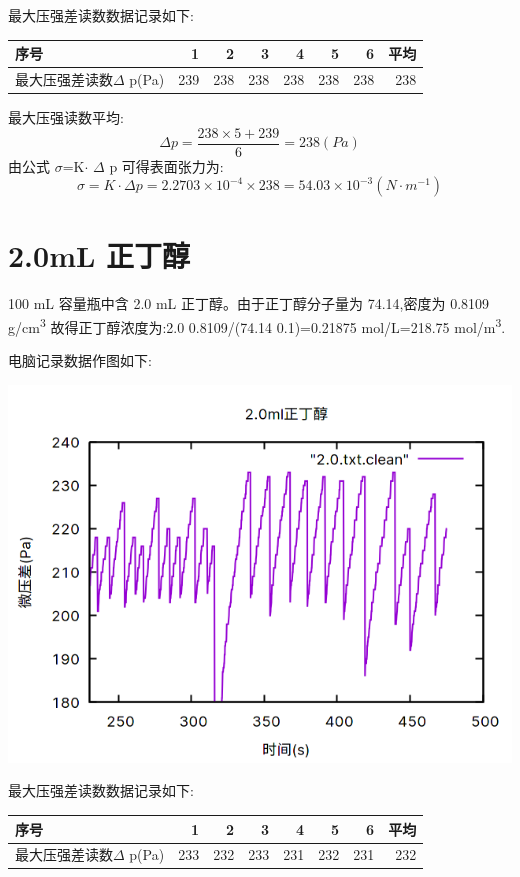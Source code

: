\documentclass[11pt]{report}
\begin{document}
最大压强差读数数据记录如下:
\begin{center}
\begin{tabular}{lrrrrrrr}
序号 & 1 & 2 & 3 & 4 & 5 & 6 & 平均\\
\hline
最大压强差读数\(\Delta\) p(Pa) & 239 & 238 & 238 & 238 & 238 & 238 & 238\\
\end{tabular}
\end{center}

最大压强读数平均:
\[
    \Delta p =\frac{238\times 5+239}{6}=238(Pa)
    \]
由公式 \(\sigma\)=K\(\cdot\) \(\Delta\) p 可得表面张力为:
\[
    \sigma=K\cdot \Delta p=2.2703\times 10^{-4}\times 238=54.03\times 10^{-3}(N\cdot m^{-1})
    \]

\section{2.0mL 正丁醇}
\label{sec:org2732ca8}
    100 mL 容量瓶中含 2.0 mL 正丁醇。由于正丁醇分子量为 74.14,密度为 0.8109 g/cm\textsuperscript{3}
故得正丁醇浓度为:2.0\texttimes{} 0.8109/(74.14\texttimes{} 0.1)=0.21875 mol/L=218.75 mol/m\textsuperscript{3}.

电脑记录数据作图如下:
\begin{center}
\includegraphics[width=.9\linewidth]{../img/2.0.png}
\end{center}

最大压强差读数数据记录如下:
\begin{center}
\begin{tabular}{lrrrrrrr}
序号 & 1 & 2 & 3 & 4 & 5 & 6 & 平均\\
\hline
最大压强差读数\(\Delta\) p(Pa) & 233 & 232 & 233 & 231 & 232 & 231 & 232\\
\end{tabular}
\end{center}
\end{document}
